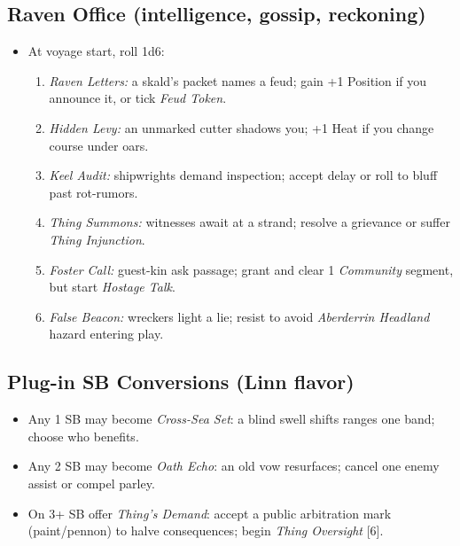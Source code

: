 \subsection*{Raven Office (intelligence, gossip, reckoning)}
\begin{itemize}
  \item At voyage start, roll 1d6:
  \begin{enumerate}
    \item \emph{Raven Letters:} a skald’s packet names a feud; gain +1 Position if you announce it, or tick \emph{Feud Token}.
    \item \emph{Hidden Levy:} an unmarked cutter shadows you; +1 Heat if you change course under oars.
    \item \emph{Keel Audit:} shipwrights demand inspection; accept delay or roll to bluff past rot-rumors.
    \item \emph{Thing Summons:} witnesses await at a strand; resolve a grievance or suffer \emph{Thing Injunction}.
    \item \emph{Foster Call:} guest-kin ask passage; grant and clear 1 \emph{Community} segment, but start \emph{Hostage Talk}.
    \item \emph{False Beacon:} wreckers light a lie; resist to avoid \emph{Aberderrin Headland} hazard entering play.
  \end{enumerate}
\end{itemize}

\subsection*{Plug-in SB Conversions (Linn flavor)}
\begin{itemize}
  \item Any 1 SB may become \emph{Cross-Sea Set}: a blind swell shifts ranges one band; choose who benefits.
  \item Any 2 SB may become \emph{Oath Echo}: an old vow resurfaces; cancel one enemy assist or compel parley.
  \item On 3+ SB offer \emph{Thing’s Demand}: accept a public arbitration mark (paint/pennon) to halve consequences; begin \emph{Thing Oversight} [6].
\end{itemize}


